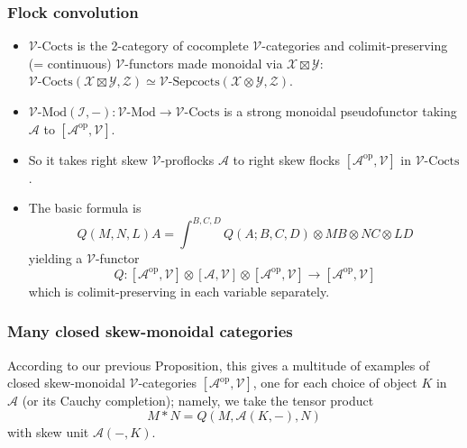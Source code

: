 \documentclass{beamer}
\newcommand{\lra}{\longrightarrow}
\def\CA{{\mathscr A}}
\def\CI{{\mathscr I}}
\def\CV{{\mathscr V}}
\def\CX{{\mathscr X}}
\def\CY{{\mathscr Y}}
\def\CZ{{\mathscr Z}}
\begin{document}
 \begin{frame}
  \frametitle{Flock convolution}
 \begin{itemize}
\item $\CV\text{-}\mathrm{Cocts}$ is the 2-category of cocomplete $\CV$-categories
and colimit-preserving (= continuous) $\CV$-functors made monoidal via $\CX \boxtimes \CY$:
$\CV\text{-}\mathrm{Cocts}(\CX \boxtimes \CY,\CZ) \simeq \CV\text{-}\mathrm{Sepcocts}(\CX \otimes \CY,\CZ)$.
\pause
\item $\CV\text{-}\mathrm{Mod}(\CI,-) : \CV\text{-}\mathrm{Mod} \lra \CV\text{-}\mathrm{Cocts} $
is a strong monoidal pseudofunctor taking $\CA$ to $[\CA^{\mathrm{op}},\CV]$.
\pause
\item So it takes right skew $\CV$-proflocks $\CA$ to right skew flocks $[\CA^{\mathrm{op}},\CV]$
in $\CV\text{-}\mathrm{Cocts}$. 
\pause
\item The basic formula is
\begin{equation}
Q(M,N,L)A=\int^{B,C,D}{Q(A;B,C,D)\otimes MB\otimes NC\otimes LD}
\end{equation}
yielding a $\CV$-functor
\begin{equation}
Q:[\CA^{\mathrm{op}},\CV]\otimes [\CA,\CV]\otimes [\CA^{\mathrm{op}},\CV]\lra [\CA^{\mathrm{op}},\CV]
\end{equation}
which is colimit-preserving in each variable separately.
\end{itemize}
\end{frame}
\begin{frame}
  \frametitle{Many closed skew-monoidal categories}
According to our previous Proposition, this gives a multitude of examples of closed skew-monoidal $\CV$-categories 
$[\CA^{\mathrm{op}},\CV]$, 
one for each choice of object $K$ in $\CA$ (or its Cauchy completion); namely,
we take the tensor product
$$M\ast N = Q(M,\CA (K,-),N)$$
with skew unit $\CA (-,K)$.
 \end{frame}
\end{document}
